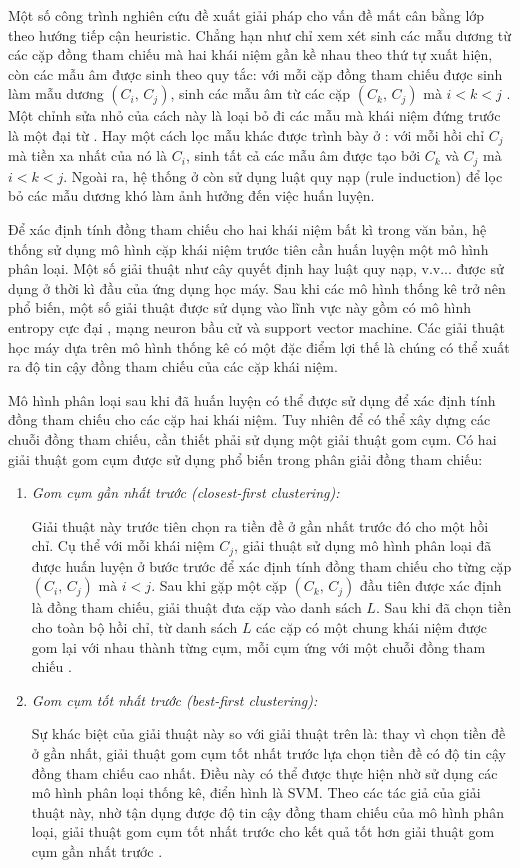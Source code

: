 Một số công trình nghiên cứu đề xuất giải pháp cho vấn đề mất cân bằng lớp theo hướng tiếp cận heuristic. Chẳng hạn như chỉ xem xét sinh các mẫu dương từ các cặp đồng tham chiếu mà hai khái niệm gần kề nhau theo thứ tự xuất hiện, còn các mẫu âm được sinh theo quy tắc: với mỗi cặp đồng tham chiếu được sinh làm mẫu dương $(C_i,\,C_j)$, sinh các mẫu âm từ các cặp $(C_k,\,C_j)$ mà $i<k<j$ \cite{Soon2001}. Một chỉnh sửa nhỏ của cách này là loại bỏ đi các mẫu mà khái niệm đứng trước là một đại từ \cite{VincentNg2002a}. Hay một cách lọc mẫu khác được trình bày ở \cite{VincentNg2002b}: với mỗi hồi chỉ $C_j$ mà tiền xa nhất của nó là $C_i$, sinh tất cả các mẫu âm được tạo bởi $C_k$ và $C_j$ mà $i<k<j$. Ngoài ra, hệ thống ở \cite{VincentNg2002b} còn sử dụng luật quy nạp (rule induction) để lọc bỏ các mẫu dương khó làm ảnh hưởng đến việc huấn luyện.

Để xác định tính đồng tham chiếu cho hai khái niệm bất kì trong văn bản, hệ thống sử dụng mô hình cặp khái niệm trước tiên cần huấn luyện một mô hình phân loại. Một số giải thuật như cây quyết định hay luật quy nạp, v.v... được sử dụng ở thời kì đầu của ứng dụng học máy. Sau khi các mô hình thống kê trở nên phổ biến, một số giải thuật được sử dụng vào lĩnh vực này gồm có mô hình entropy cực đại \cite{Berger1996}, mạng neuron bầu cử \cite{Freund1999} và support vector machine. Các giải thuật học máy dựa trên mô hình thống kê có một đặc điểm lợi thế là chúng có thể xuất ra độ tin cậy đồng tham chiếu của các cặp khái niệm. 

Mô hình phân loại sau khi đã huấn luyện có thể được sử dụng để xác định tính đồng tham chiếu cho các cặp hai khái niệm. Tuy nhiên để có thể xây dựng các chuỗi đồng tham chiếu, cần thiết phải sử dụng một giải thuật gom cụm. Có hai giải thuật gom cụm được sử dụng phổ biến trong phân giải đồng tham chiếu:

\begin{enumerate}
\item \emph{Gom cụm gần nhất trước (closest-first clustering):}

Giải thuật này trước tiên chọn ra tiền đề ở gần nhất trước đó cho một hồi chỉ. Cụ thể với mỗi khái niệm $C_j$, giải thuật sử dụng mô hình phân loại đã được huấn luyện ở bước trước để xác định tính đồng tham chiếu cho từng cặp $(C_i,\,C_j)$ mà $i<j$. Sau khi gặp một cặp $(C_k,\,C_j)$ đầu tiên được xác định là đồng tham chiếu, giải thuật đưa cặp vào danh sách $L$. Sau khi đã chọn tiền cho toàn bộ hồi chỉ, từ danh sách $L$ các cặp có một chung khái niệm được gom lại với nhau thành từng cụm, mỗi cụm ứng với một chuỗi đồng tham chiếu \cite{Soon2001}.
\item \emph{Gom cụm tốt nhất trước (best-first clustering):}

Sự khác biệt của giải thuật này so với giải thuật trên là: thay vì chọn tiền đề ở gần nhất, giải thuật gom cụm tốt nhất trước lựa chọn tiền đề có độ tin cậy đồng tham chiếu cao nhất. Điều này có thể được thực hiện nhờ sử dụng các mô hình phân loại thống kê, điển hình là SVM. Theo các tác giả của giải thuật này, nhờ tận dụng được độ tin cậy đồng tham chiếu của mô hình phân loại, giải thuật gom cụm tốt nhất trước cho kết quả tốt hơn giải thuật gom cụm gần nhất trước \cite{VincentNg2002a}.
\end{enumerate}

